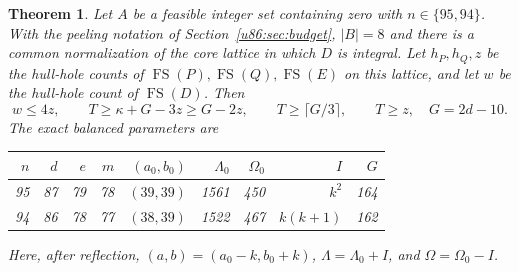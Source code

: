 \documentclass[11pt,a4paper]{article}
\newtheorem{theorem}{Theorem}[section]
\theoremstyle{remark}
\newcommand{\FS}{\operatorname{FS}}
\begin{document}
\begin{theorem}\label{u86:thm:lattice}
Let $A$ be a feasible integer set containing zero with $n\in\{95,94\}$.
With the peeling notation of Section~\ref{u86:sec:budget}, $|B|=8$ and there
is a common normalization of the core lattice in which $D$ is integral.
Let $h_P,h_Q,z$ be the hull-hole counts of $\FS(P),\FS(Q),\FS(E)$ on this
lattice, and let $w$ be the hull-hole count of $\FS(D)$. Then
\begin{equation}\label{u86:eq:newbudget}
 w\le4z,\qquad
 T\ge\kappa+G-3z\ge G-2z,\qquad
 T\ge\lceil G/3\rceil,\qquad T\ge z,
 \quad G=2d-10.
\end{equation}
The exact balanced parameters are
\begin{center}
\begin{tabular}{rrrrrrrrr}
\toprule
$n$&$d$&$e$&$m$&$(a_0,b_0)$&$\Lambda_0$&$\Omega_0$&$I$&$G$\\\midrule
95&87&79&78&$(39,39)$&1561&450&$k^2$&164\\
94&86&78&77&$(38,39)$&1522&467&$k(k+1)$&162\\\bottomrule
\end{tabular}
\end{center}
Here, after reflection, $(a,b)=(a_0-k,b_0+k)$,
$\Lambda=\Lambda_0+I$, and $\Omega=\Omega_0-I$.
\end{theorem}
\end{document}
